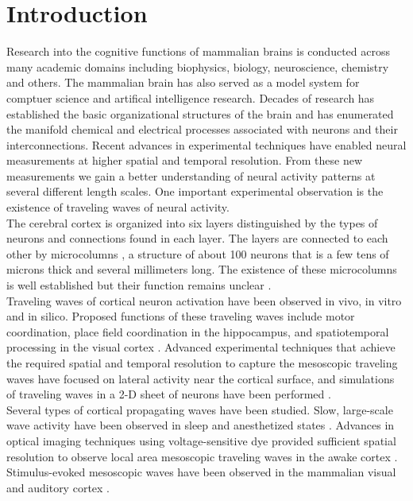 \documentclass[a4paper,11pt]{article}
\begin{document}
\section{Introduction} 
Research into the cognitive functions of mammalian brains is conducted across many academic domains including biophysics, biology, neuroscience, chemistry and others.
The mammalian brain has also served as a model system for comptuer science and artifical intelligence research.
Decades of research has established the basic organizational structures of the brain and has enumerated the manifold chemical and electrical processes associated with neurons and their interconnections.
Recent advances in experimental techniques have enabled neural measurements at higher spatial and temporal resolution.
From these new measurements we gain a better understanding of neural activity patterns at several different length scales.
One important experimental observation is the existence of traveling waves of neural activity.
\\
The cerebral cortex is organized into six layers distinguished by the types of neurons and connections found in each layer.
The layers are connected to each other by microcolumns \cite{cruz2005}, a structure of about 100 neurons that is a few tens of microns thick and several millimeters long.
The existence of these microcolumns is well established but their function remains unclear \cite{horton2005}. 
\\
Traveling waves of cortical neuron activation have been observed in vivo, in vitro and in silico. 
Proposed functions of these traveling waves include motor coordination, place field coordination in the hippocampus, and spatiotemporal processing in the visual cortex \cite{muller2018}. 
Advanced experimental techniques that achieve the required spatial and temporal resolution \cite{shoham1999} to capture the mesoscopic traveling waves have focused on lateral activity near the cortical surface, and simulations of traveling waves in a 2-D sheet of neurons have been performed \cite{keane2015}. 
\\
Several types of cortical propagating waves have been studied.
Slow, large-scale wave activity have been observed in sleep and anesthetized states \cite{muller2018}.
Advances in optical imaging techniques using voltage-sensitive dye provided sufficient spatial resolution to observe local area mesoscopic traveling waves in the awake cortex \cite{wu2008}.
Stimulus-evoked mesoscopic waves have been observed in the mammalian visual and auditory cortex \cite{reimer2010}\cite{muller2018}.
\end{document}
